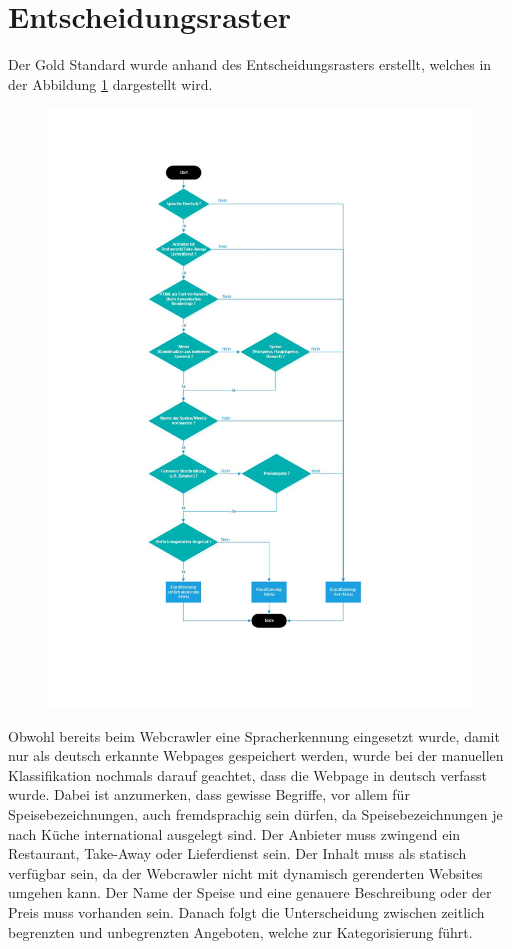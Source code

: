 \section{Entscheidungsraster}
Der Gold Standard wurde anhand des Entscheidungsrasters erstellt, welches in der Abbildung \cref{fig:classificationtree} dargestellt wird.
\begin{figure}
	\label{fig:classificationtree}
	\includegraphics[width=1\columnwidth,keepaspectratio]{img/man-classification-tree.jpg}
\end{figure}
Obwohl bereits beim Webcrawler eine Spracherkennung eingesetzt wurde, damit nur als deutsch erkannte Webpages gespeichert werden, wurde bei der manuellen Klassifikation nochmals darauf geachtet, dass die Webpage in deutsch verfasst wurde.
Dabei ist anzumerken, dass gewisse Begriffe, vor allem für Speisebezeichnungen, auch fremdsprachig sein dürfen, da Speisebezeichnungen je nach Küche international ausgelegt sind.
Der Anbieter muss zwingend ein Restaurant, Take-Away oder Lieferdienst sein.
Der Inhalt muss als statisch verfügbar sein, da der Webcrawler nicht mit dynamisch gerenderten Websites umgehen kann.
Der Name der Speise und eine genauere Beschreibung oder der Preis muss vorhanden sein.
Danach folgt die Unterscheidung zwischen zeitlich begrenzten und unbegrenzten Angeboten, welche zur Kategorisierung führt.

